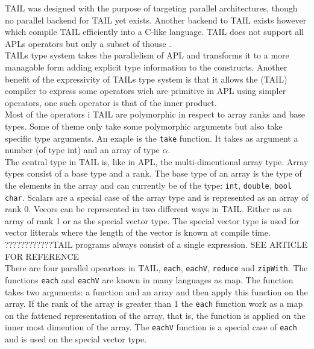 \documentclass[11pt]{article}
\begin{document}

TAIL was designed with the purpose of targeting parallel architectures, though no parallel backend for TAIL yet exists.
Another backend to TAIL exists however which compile TAIL efficiently into a C-like language. TAIL does not support
 all APLs operators but only a subset of thouse \cite{ElsmanDybdal:Array:2014}.\\

TAILs type system takes the parallelism of APL and transforms it to a more managable form adding explicit type
 information to the constructs. Another benefit of the expressivity of TAILs type system is that it allows the (TAIL) compiler to express some operators wich are primitive in APL using simpler operators, one such operator is that of the inner product. \\
 
Most of the operators i TAIL are polymorphic in respect to array ranks and base types. Some of theme only take some
polymorphic arguments but also take specific type arguments. An exaple is the {\tt take} function. It takes as argument 
a number (of type int) and an array of type $\alpha$.\\

The central type in TAIL is, like in APL, the multi-dimentional array type. Array types consist of a base type and a rank. The base type of an array is the type of the elements in the array and can currently be of the type: {\tt int}, 
{\tt double}, {\tt bool} {\tt char}. 
Scalars are a special case of the array type and is represented as an array of rank 0. 
Vecors can be represented in two different ways in TAIL. Either as an array of rank 1 or as the special vector type. The special vector type is used for vector litterals where the length of the vector is known at compile time. \\

????????????TAIL programs always consist of a single expression. SEE ARTICLE FOR REFERENCE \\

There are four parallel opeartors in TAIL, {\tt each}, {\tt eachV}, {\tt reduce} and {\tt zipWith}. The functions {\tt each} and
 {\tt eachV} are known in many languages as map. The function takes two arguments: a function and an array and then apply this function on the array. If the rank of the array is greater than 1 the {\tt each} function work as a map on the fattened representation of the array, that is, the function is applied on the inner most dimention of the array. The {\tt eachV} function is a special case of {\tt each} and is used on the special vector type.\\
\end{document}
